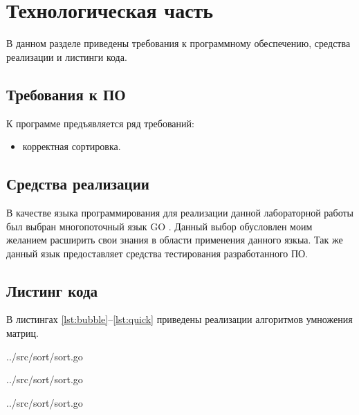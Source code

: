\chapter{Технологическая часть}

В данном разделе приведены требования к программному обеспечению, средства реализации и листинги кода.

\section{Требования к ПО}

К программе предъявляется ряд требований:
\begin{itemize}
	\item корректная сортировка.
\end{itemize}

\section{Средства реализации}

В качестве языка программирования для реализации данной лабораторной работы был выбран многопоточный язык GO \cite{golang}. Данный выбор обусловлен моим желанием расширить свои знания в области применения данного язкыа. Так же данный язык предоставляет средства тестирования разработанного ПО.

\clearpage

\section{Листинг кода}

В листингах \ref{lst:bubble}--\ref{lst:quick} приведены реализации алгоритмов умножения матриц.

\begin{lstinputlisting}[
	caption={Сортировка пузырьком},
	label={lst:bubble},
	style={go},
	linerange={9-17},
	]{../src/sort/sort.go}
\end{lstinputlisting}

\begin{lstinputlisting}[
	caption={Сортировка вставками},
	label={lst:insert},
	style={go},
	linerange={20-30},
	]{../src/sort/sort.go}
\end{lstinputlisting}

\begin{lstinputlisting}[
	caption={Быстрая сортировка},
	label={lst:quick},
	style={go},
	linerange={45-69},
	]{../src/sort/sort.go}
\end{lstinputlisting}


